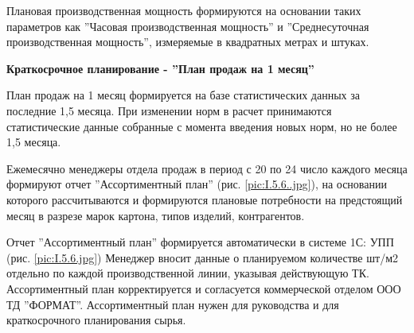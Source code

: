 Плановая производственная мощность формируются на основании таких параметров как ''Часовая производственная мощность'' и ''Среднесуточная производственная мощность'', измеряемые в квадратных метрах и штуках.



\textbf{Краткосрочное планирование - ''План продаж на 1 месяц''}

План продаж на 1 месяц формируется на базе статистических данных за последние 1,5 месяца. При изменении норм в расчет принимаются статистические данные собранные с момента введения новых норм, но не более 1,5 месяца.

Ежемесячно менеджеры отдела продаж в период с 20 по 24 число каждого месяца формируют отчет ''Ассортиментный план'' (рис. \ref{pic:I.5.6..jpg}), на основании которого рассчитываются и формируются плановые потребности на предстоящий месяц в разрезе марок картона, типов изделий, контрагентов.

Отчет ''Ассортиментный план'' формируется автоматически в системе 1С: УПП (рис. \ref{pic:I.5.6.jpg})
Менеджер вносит данные о планируемом количестве шт/м2 отдельно по каждой производственной линии, указывая действующую ТК.
Ассортиментный план корректируется и согласуется коммерческой отделом ООО ТД ''ФОРМАТ''. Ассортиментный план нужен для руководства и для краткосрочного планирования сырья.










